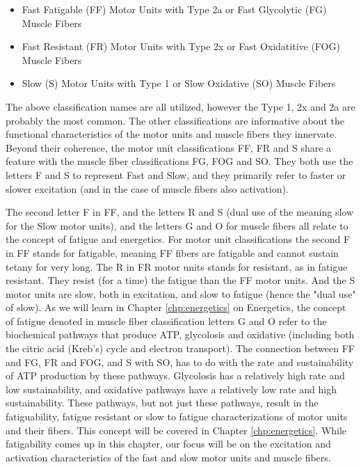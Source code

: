\begin{itemize}
    \item Fast Fatigable (FF) Motor Units with Type 2a or Fast Glycolytic (FG) Muscle Fibers
    \item Fast Resistant (FR) Motor Units with Type 2x or Fast Oxidatitive (FOG) Muscle Fibers
    \item Slow (S) Motor Units with Type 1 or Slow Oxidative (SO) Muscle Fibers
\end{itemize}

The above classification names are all utilized, however the Type 1, 2x and 2a are probably the most common. The other classifications are informative about the functional characteristics of the motor units and muscle fibers they innervate. Beyond their coherence, the motor unit classifications FF, FR and S share a feature with the muscle fiber classifications FG, FOG and SO. They both use the letters F and S to represent Fast and Slow, and they primarily refer to faster or slower excitation (and in the case of muscle fibers also activation). 

The second letter F in FF, and the letters R and S (dual use of the meaning slow for the Slow motor units), and the letters G and O for muscle fibers all relate to the concept of fatigue and energetics. For motor unit classifications the second F in FF stands for fatigable, meaning FF fibers are fatigable and cannot sustain tetany for very long. The R in FR motor units stands for resistant, as in fatigue resistant. They resist (for a time) the fatigue than the FF motor units. And the S motor units are slow, both in excitation, and slow to fatigue (hence the "dual use" of slow). As we will learn in Chapter \ref{chp:energetics} on Energetics, the concept of fatigue denoted in muscle fiber classification letters G and O refer to the biochemical pathways that produce ATP, glycolosis and oxidative (including both the citric acid (Kreb's) cycle and electron transport). The connection between FF and FG, FR and FOG, and S with SO, has to do with the rate and sustainability of ATP production by these pathways. Glycolosis has a relatively high rate and low sustainability, and oxidative pathways have a relatively low rate and high sustainability. These pathways, but not just these pathways, result in the fatiguability, fatigue resistant or slow to fatigue characterizations of motor units and their fibers. This concept will be covered in Chapter \ref{chp:energetics}. While fatigability comes up in this chapter, our focus will be on the excitation and activation characteristics of the fast and slow motor units and muscle fibers.

